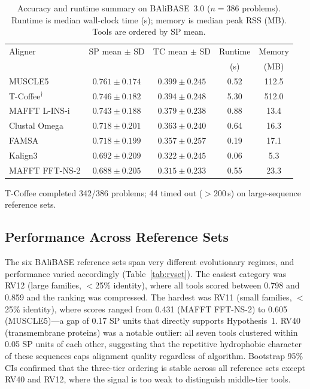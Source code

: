 \documentclass[unnumsec,webpdf,contemporary,large]{oup-authoring-template}
\begin{document}
\begin{table}[!htbp]
\caption{Accuracy and runtime summary on BAliBASE~3.0 ($n = 386$
problems). Runtime is median wall-clock time (s); memory is median peak
RSS (MB). Tools are ordered by SP mean.}
\label{tab:summary}
\begin{tabular*}{\textwidth}{@{\extracolsep{\fill}}lcccc@{}}
\toprule
Aligner & SP mean $\pm$ SD & TC mean $\pm$ SD & Runtime & Memory \\
        &                  &                  & (s)     & (MB)   \\
\midrule
MUSCLE5        & $0.761 \pm 0.174$ & $0.399 \pm 0.245$ & 0.52 & 112.5 \\
T-Coffee$^{\dagger}$
               & $0.746 \pm 0.182$ & $0.394 \pm 0.248$ & 5.30 & 512.0 \\
MAFFT L-INS-i  & $0.743 \pm 0.188$ & $0.379 \pm 0.238$ & 0.88 &  13.4 \\
Clustal Omega  & $0.718 \pm 0.201$ & $0.363 \pm 0.240$ & 0.64 &  16.3 \\
FAMSA          & $0.718 \pm 0.199$ & $0.357 \pm 0.257$ & 0.19 &  17.1 \\
Kalign3        & $0.692 \pm 0.209$ & $0.322 \pm 0.245$ & 0.06 &   5.3 \\
MAFFT FFT-NS-2 & $0.688 \pm 0.205$ & $0.315 \pm 0.233$ & 0.55 &  23.3 \\
\bottomrule
\end{tabular*}
\begin{tablenotes}
\item[$^{\dagger}$] T-Coffee completed 342/386 problems; 44 timed out
  ($>$200\,s) on large-sequence reference sets.
\end{tablenotes}
\end{table}

\subsection{Performance Across Reference Sets}

The six BAliBASE reference sets span very different evolutionary regimes,
and performance varied accordingly (Table~\ref{tab:rvset}).
The easiest category was RV12 (large families, $<$25\% identity), where all
tools scored between 0.798 and 0.859 and the ranking was compressed.
The hardest was RV11 (small families, $<$25\% identity), where scores ranged
from 0.431 (MAFFT FFT-NS-2) to 0.605 (MUSCLE5)---a gap of 0.17 SP units
that directly supports Hypothesis~1.
RV40 (transmembrane proteins) was a notable outlier: all seven tools
clustered within 0.05 SP units of each other, suggesting that the
repetitive hydrophobic character of these sequences caps alignment quality
regardless of algorithm.
Bootstrap 95\% CIs confirmed that the three-tier ordering is stable across
all reference sets except RV40 and RV12, where the signal is too weak to
distinguish middle-tier tools.
\end{document}
